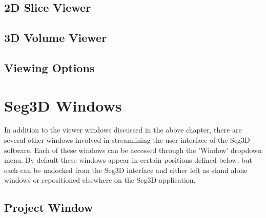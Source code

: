 \documentclass[fleqn,11pt,openany]{book}
\begin{document}
\begin{introduction}

\end{introduction}

\section{2D Slice Viewer}

\section{3D Volume Viewer}

\section{Viewing Options}

\chapter{Seg3D Windows}

\begin{introduction}
In addition to the viewer windows discussed in the above chapter, there are several other
 windows involved in streamlining the user interface of the Seg3D software.  
 Each of these windows can be accessed through the 'Window' dropdown menu.
 By default these windows appear in certain positions defined below, but each can be undocked
 from the Seg3D interface and either left as stand alone windows or repositioned elsewhere on
 the Seg3D application.
  
\end{introduction}

\section{Project Window}
\end{document}

